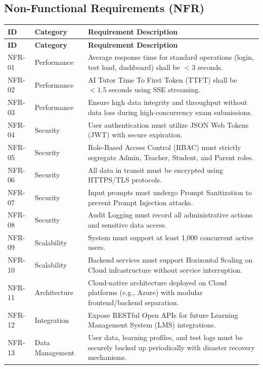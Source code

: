 \documentclass[12pt,a4paper]{article}
\begin{document}
\subsection{Non-Functional Requirements (NFR)}

\renewcommand{\arraystretch}{1.25}
\begin{xltabular}{\textwidth}{l p{3.2cm} X}
\toprule
\textbf{ID} & \textbf{Category} & \textbf{Requirement Description} \\
\midrule
\endfirsthead

\toprule
\textbf{ID} & \textbf{Category} & \textbf{Requirement Description} \\
\midrule
\endhead

\bottomrule
\endfoot

NFR-01 & Performance & Average response time for standard operations (login, test load, dashboard) shall be $< 3$ seconds. \\
\addlinespace[0.2em]
NFR-02 & Performance & AI Tutor Time To First Token (TTFT) shall be $< 1.5$ seconds using SSE streaming. \\
\addlinespace[0.2em]
NFR-03 & Performance & Ensure high data integrity and throughput without data loss during high-concurrency exam submissions. \\
\addlinespace[0.2em]
NFR-04 & Security & User authentication must utilize JSON Web Tokens (JWT) with secure expiration. \\
\addlinespace[0.2em]
NFR-05 & Security & Role-Based Access Control (RBAC) must strictly segregate Admin, Teacher, Student, and Parent roles. \\
\addlinespace[0.2em]
NFR-06 & Security & All data in transit must be encrypted using HTTPS/TLS protocols. \\
\addlinespace[0.2em]
NFR-07 & Security & Input prompts must undergo Prompt Sanitization to prevent Prompt Injection attacks. \\
\addlinespace[0.2em]
NFR-08 & Security & Audit Logging must record all administrative actions and sensitive data access. \\
\addlinespace[0.2em]
NFR-09 & Scalability & System must support at least 1,000 concurrent active users. \\
\addlinespace[0.2em]
NFR-10 & Scalability & Backend services must support Horizontal Scaling on Cloud infrastructure without service interruption. \\
\addlinespace[0.2em]
NFR-11 & Architecture & Cloud-native architecture deployed on Cloud platforms (e.g., Azure) with modular frontend/backend separation. \\
\addlinespace[0.2em]
NFR-12 & Integration & Expose RESTful Open APIs for future Learning Management System (LMS) integrations. \\
\addlinespace[0.2em]
NFR-13 & Data Management & User data, learning profiles, and test logs must be securely backed up periodically with disaster recovery mechanisms. \\
\end{xltabular}
\end{document}
